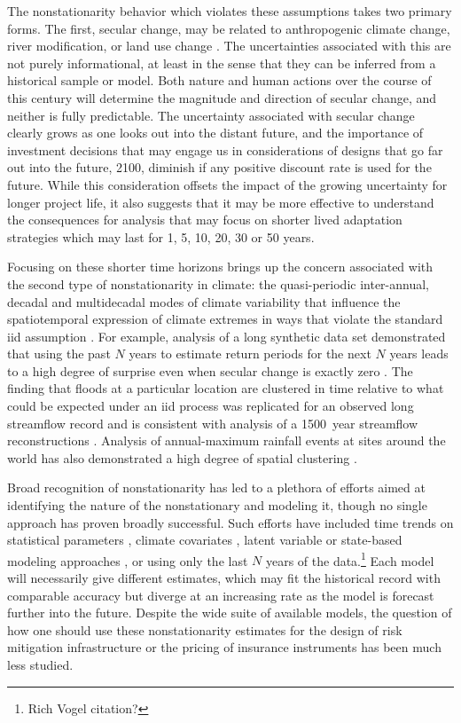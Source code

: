 \documentclass[12pt]{article}
\begin{document}
The nonstationarity behavior which violates these assumptions takes two primary forms.
The first, secular change, may be related to anthropogenic climate change, river modification, or land use change \citep{Merz2014}.
The uncertainties associated with this are not purely informational, at least in the sense that they can be inferred from a historical sample or model.
Both nature and human actions over the course of this century will determine the magnitude and direction of secular change, and neither is fully predictable.
The uncertainty associated with secular change clearly grows as one looks out into the distant future, and the importance of investment decisions that may engage us in considerations of designs that go far out into the future, \eg{} 2100, diminish if any positive discount rate is used for the future.
While this consideration offsets the impact of the growing uncertainty for longer project life, it also suggests that it may be more effective to understand the consequences for analysis that may focus on shorter lived adaptation strategies which may last for 1, 5, 10, 20,  30 or 50 years.

Focusing on these shorter time horizons brings up the concern associated with the second type of nonstationarity in climate: the quasi-periodic inter-annual, decadal and multidecadal modes of climate variability that influence the spatiotemporal expression of climate extremes in ways that violate the standard \gls{iid} assumption \citep{Matalas2012,Hannachi2017}.
For example, analysis of a long synthetic data set demonstrated that using the past $N$ years to estimate return periods for the next $N$ years leads to a high degree of surprise even when secular change is exactly zero \citep{Jain2001}.
The finding that floods at a particular location are clustered in time relative to what could be expected under an \gls{iid} process was replicated for an observed long streamflow record \citep{Jain2001} and is consistent with analysis of a \SI{1500}{year} streamflow reconstructions \citep{Swierczynski2012}.
Analysis of annual-maximum rainfall events at sites around the world has also demonstrated a high degree of spatial clustering \citep{Bonnafous2017a}.

Broad recognition of nonstationarity has led to a plethora of efforts aimed at identifying the nature of the nonstationary and modeling it, though no single approach has proven broadly successful.
Such efforts have included time trends on statistical parameters \citep{Strupczewski2001,Vogel2011,Obeysekera2014,Serinaldi2015}, climate covariates \citep{Griffis2007,Sun2014,Hall2014,Delgado2014,Silva2016}, latent variable or state-based modeling approaches \citep{Waylen1986,Sveinsson2005,Griffis2007}, or using only the last $N$ years of the data.\footnote{Rich Vogel citation?}
Each model will necessarily give different estimates, which may fit the historical record with comparable accuracy but diverge at an increasing rate as the model is forecast further into the future.
Despite the wide suite of available models, the question of how one should use these nonstationarity estimates for the design of risk mitigation infrastructure or the pricing of insurance instruments has been much less studied.
\end{document}
